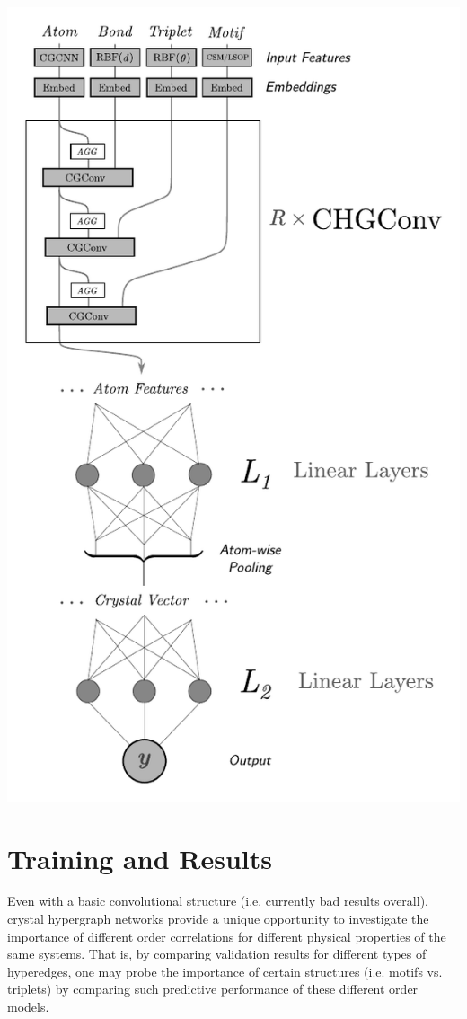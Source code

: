 \documentclass[10pt,a4paper]{article}
\begin{document}
\begin{center}
\includegraphics[scale=.75]{arch.pdf}
\end{center}


\section{Training and Results}
Even with a basic convolutional structure (i.e. currently bad results overall), crystal hypergraph networks provide a unique opportunity to investigate the importance of different order correlations for different physical properties of the same systems. That is, by comparing validation results for different types of hyperedges, one may probe the importance of certain structures (i.e. motifs vs. triplets) by comparing such predictive performance of these different order models.
\end{document}
